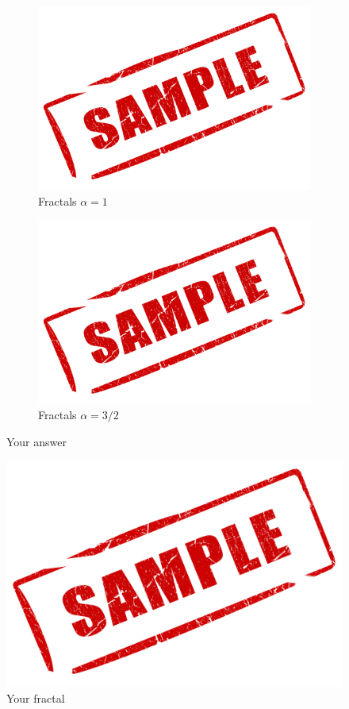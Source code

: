 \documentclass[paper=a4, fontsize=12pt]{scrartcl} %
\numberwithin{equation}{section}       %
\numberwithin{figure}{section}         %
\numberwithin{table}{section}          %
\begin{document}
\begin{figure}[H]
    \centering
    \begin{subfigure}[b]{0.49\textwidth}
        \includegraphics[width=\textwidth]{sample}
        \caption{Fractals $\alpha=1$}
    \end{subfigure}
    \begin{subfigure}[b]{0.49\textwidth}
        \includegraphics[width=\textwidth]{sample}
        \caption{Fractals $\alpha=3/2$}
    \end{subfigure}
    \caption{Your answer}
\end{figure}

\begin{figure}[H]
    \centering
        \includegraphics[width=.8\textwidth]{sample}
    \caption{Your fractal}
\end{figure}

  
\end{document}
